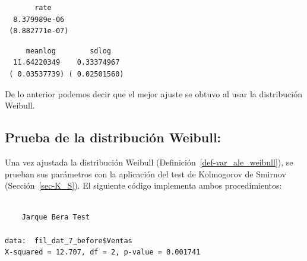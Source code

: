 \documentclass[
  us-letterpaper,
]{scrreprt}
\newenvironment{Shaded}{\begin{snugshade}}{\end{snugshade}}
\newcommand{\CommentTok}[1]{\textcolor[rgb]{0.37,0.37,0.37}{#1}}
\newcommand{\FunctionTok}[1]{\textcolor[rgb]{0.28,0.35,0.67}{#1}}
\newcommand{\NormalTok}[1]{\textcolor[rgb]{0.00,0.23,0.31}{#1}}
\newcommand{\OtherTok}[1]{\textcolor[rgb]{0.00,0.23,0.31}{#1}}
\newcommand{\SpecialCharTok}[1]{\textcolor[rgb]{0.37,0.37,0.37}{#1}}
\newcommand{\StringTok}[1]{\textcolor[rgb]{0.13,0.47,0.30}{#1}}
\theoremstyle{plain}
\theoremstyle{plain}
\theoremstyle{definition}
\theoremstyle{remark}
\begin{document}
\begin{verbatim}
       rate    
  8.379989e-06 
 (8.882771e-07)
\end{verbatim}

\begin{Shaded}
\end{Shaded}

\begin{verbatim}
     meanlog        sdlog   
  11.64220349    0.33374967 
 ( 0.03537739) ( 0.02501560)
\end{verbatim}

De lo anterior podemos decir que el mejor ajuste se obtuvo al usar la
distribución Weibull.

\subsection{Prueba de la distribución
Weibull:}\label{prueba-de-la-distribuciuxf3n-weibull}

Una vez ajustada la distribución Weibull
(Definición~\ref{def-var_ale_weibull}), se prueban sus parámetros con la
aplicación del test de Kolmogorov de Smirnov (Sección~\ref{sec-K_S}). El
siguiente código implementa ambos procedimientos:

\begin{Shaded}
\end{Shaded}

\begin{verbatim}

    Jarque Bera Test

data:  fil_dat_7_before$Ventas
X-squared = 12.707, df = 2, p-value = 0.001741
\end{verbatim}

\begin{Shaded}
\end{Shaded}
\end{document}
